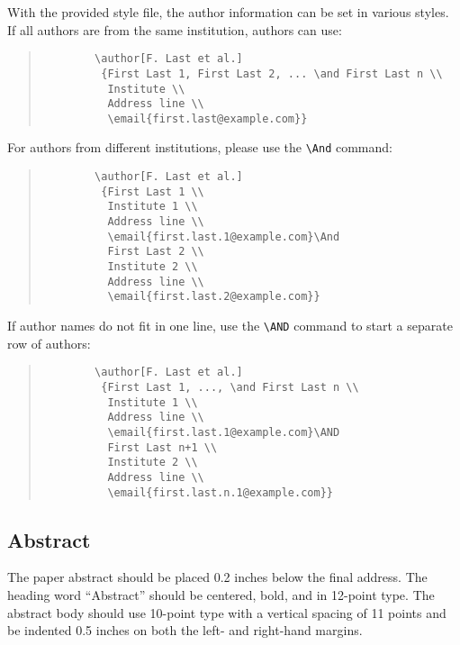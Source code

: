 \documentclass{article}
\begin{document}
With the provided style file, the author information can be set in various styles.
If all authors are from the same institution, authors can use:
\begin{quote}
	\begin{verbatim}
		\author[F. Last et al.]
		 {First Last 1, First Last 2, ... \and First Last n \\
		  Institute \\
		  Address line \\
		  \email{first.last@example.com}}
	\end{verbatim}
\end{quote}
For authors from different institutions, please use the \verb+\And+ command:
\begin{quote}
	\begin{verbatim}
		\author[F. Last et al.]
		 {First Last 1 \\
		  Institute 1 \\
		  Address line \\
		  \email{first.last.1@example.com}\And
		  First Last 2 \\
		  Institute 2 \\
		  Address line \\
		  \email{first.last.2@example.com}}
	\end{verbatim}
\end{quote}
If author names do not fit in one line, use the \verb+\AND+ command to start a separate row of authors:
\begin{quote}
	\begin{verbatim}
		\author[F. Last et al.]
		 {First Last 1, ..., \and First Last n \\
		  Institute 1 \\
		  Address line \\
		  \email{first.last.1@example.com}\AND
		  First Last n+1 \\
		  Institute 2 \\
		  Address line \\
		  \email{first.last.n.1@example.com}}
	\end{verbatim}
\end{quote}

\subsection{Abstract}

The paper abstract should be placed 0.2 inches below the final address.
The heading word ``Abstract'' should be centered, bold, and in 12-point type.
The abstract body should use 10-point type with a vertical spacing of 11 points and be indented 0.5 inches on both the left- and right-hand margins.
\end{document}
